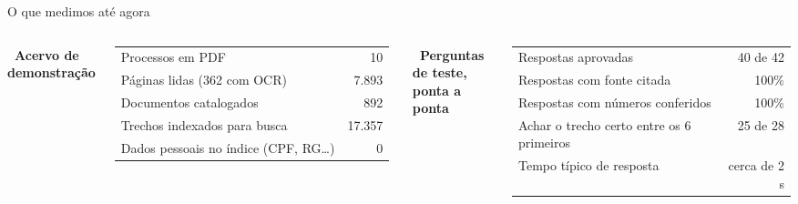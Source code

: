 \documentclass[aspectratio=169,10pt]{beamer}
\begin{document}
\begin{frame}{O que medimos até agora}
  \begin{columns}[T]
      \textbf{\textcolor{petroleo}{\faDatabase\ Acervo de demonstração}}\\[4pt]
      \small
      \begin{tabularx}{\linewidth}{@{}X r@{}}
        \toprule
        Processos em PDF                       & 10 \\
        Páginas lidas (362 com OCR)            & 7.893 \\
        Documentos catalogados                 & 892 \\
        Trechos indexados para busca           & 17.357 \\
        Dados pessoais no índice (CPF, RG\dots) & 0 \\
        \bottomrule
      \end{tabularx}
      \textbf{\textcolor{petroleo}{\faClipboardCheck\ Perguntas de teste, ponta a ponta}}\\[4pt]
      \small
      \begin{tabularx}{\linewidth}{@{}X r@{}}
        \toprule
        Respostas aprovadas                    & 40 de 42 \\
        Respostas com fonte citada             & 100\% \\
        Respostas com números conferidos       & 100\% \\
        Achar o trecho certo entre os 6 primeiros & 25 de 28 \\
        Tempo típico de resposta               & cerca de 2 s \\
        \bottomrule
      \end{tabularx}
  \end{columns}
  \vfill
\end{frame}
\end{document}
